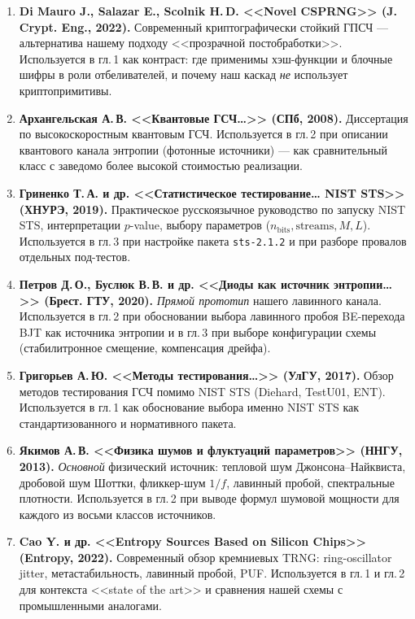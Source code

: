 \documentclass[12pt,a4paper]{extarticle}
\begin{document}
\begin{enumerate}
  \item \textbf{Di Mauro J., Salazar E., Scolnik H.\,D. <<Novel CSPRNG>>
    (J. Crypt. Eng., 2022).} Современный криптографически стойкий ГПСЧ ---
    альтернатива нашему подходу <<прозрачной постобработки>>. Используется
    в гл.\,1 как контраст: где применимы хэш-функции и блочные шифры в роли
    отбеливателей, и почему наш каскад \emph{не} использует криптопримитивы.

  \item \textbf{Архангельская А.\,В. <<Квантовые ГСЧ\ldots>> (СПб, 2008).}
    Диссертация по высокоскоростным квантовым ГСЧ. Используется в гл.\,2
    при описании квантового канала энтропии (фотонные источники) ---
    как сравнительный класс с заведомо более высокой стоимостью реализации.

  \item \textbf{Гриненко Т.\,А. и др. <<Статистическое тестирование\ldots
    NIST STS>> (ХНУРЭ, 2019).} Практическое русскоязычное руководство по
    запуску NIST STS, интерпретации $p$-value, выбору параметров
    ($n_{\mathrm{bits}}, \text{streams}, M, L$). Используется в гл.\,3 при
    настройке пакета \texttt{sts-2.1.2} и при разборе провалов отдельных
    под-тестов.

  \item \textbf{Петров Д.\,О., Буслюк В.\,В. и др. <<Диоды как источник
    энтропии\ldots>> (Брест. ГТУ, 2020).} \emph{Прямой прототип} нашего
    лавинного канала. Используется в гл.\,2 при обосновании выбора лавинного
    пробоя BE-перехода BJT как источника энтропии и в гл.\,3 при выборе
    конфигурации схемы (стабилитронное смещение, компенсация дрейфа).

  \item \textbf{Григорьев А.\,Ю. <<Методы тестирования\ldots>>
    (УлГУ, 2017).} Обзор методов тестирования ГСЧ помимо NIST STS
    (Diehard, TestU01, ENT). Используется в гл.\,1 как обоснование выбора
    именно NIST STS как стандартизованного и нормативного пакета.

  \item \textbf{Якимов А.\,В. <<Физика шумов и флуктуаций параметров>>
    (ННГУ, 2013).} \emph{Основной} физический источник: тепловой шум
    Джонсона--Найквиста, дробовой шум Шоттки, фликкер-шум $1/f$, лавинный
    пробой, спектральные плотности. Используется в гл.\,2 при выводе
    формул шумовой мощности для каждого из восьми классов источников.

  \item \textbf{Cao Y. и др. <<Entropy Sources Based on Silicon Chips>>
    (Entropy, 2022).} Современный обзор кремниевых TRNG: ring-oscillator
    jitter, метастабильность, лавинный пробой, PUF. Используется в гл.\,1
    и гл.\,2 для контекста <<state of the art>> и сравнения нашей схемы с
    промышленными аналогами.


\end{enumerate}
\end{document}
